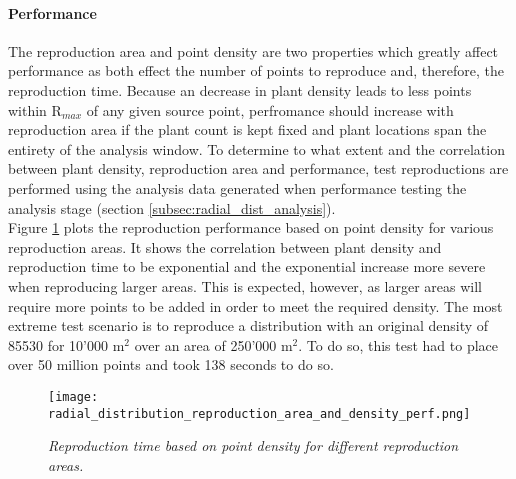 \paragraph{Performance}

The reproduction area and point density are two properties which greatly affect performance as both effect the number of points to reproduce and, therefore, the reproduction time. Because an decrease in plant density leads to less points within R$_{max}$ of any given source point, perfromance should increase with reproduction area if the plant count is kept fixed and plant locations span the entirety of the analysis window. To determine to what extent and the correlation between plant density, reproduction area and performance, test reproductions are performed using the analysis data generated when performance testing the analysis stage (section \ref{subsec:radial_dist_analysis}).\\

Figure \ref{fig:reproduction_density_area_perf} plots the reproduction performance based on point density for various reproduction areas. It shows the correlation between plant density and reproduction time to be exponential and the exponential increase more severe when reproducing larger areas. This is expected, however, as larger areas will require more points to be added in order to meet the required density. The most extreme test scenario is to reproduce a distribution with an original density of 85530 for 10'000 m$^{2}$ over an area of 250'000 m$^{2}$. To do so, this test had to place over 50 million points and took 138 seconds to do so.\\

\begin{figure}
\center
	\texttt{[image: radial\_distribution\_reproduction\_area\_and\_density\_perf.png]}
	\caption{ \textit{Reproduction time based on point density for different reproduction areas.}}	
	\label{fig:reproduction_density_area_perf}
\end{figure}


